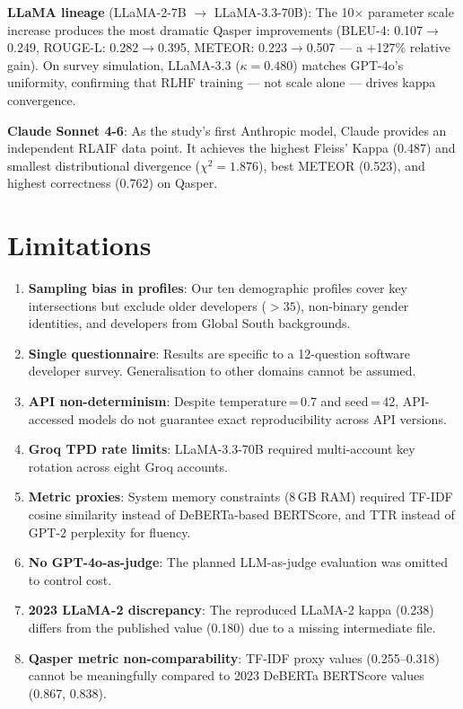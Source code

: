 \documentclass[11pt,a4paper]{article}
\begin{document}
\textbf{LLaMA lineage} (LLaMA-2-7B $\rightarrow$ LLaMA-3.3-70B): The 10$\times$
parameter scale increase produces the most dramatic Qasper improvements
(BLEU-4: 0.107$\rightarrow$0.249, ROUGE-L: 0.282$\rightarrow$0.395, METEOR:
0.223$\rightarrow$0.507 --- a {+}127\% relative gain). On survey simulation,
LLaMA-3.3 ($\kappa{=}0.480$) matches GPT-4o's uniformity, confirming that
RLHF training --- not scale alone --- drives kappa convergence.

\textbf{Claude Sonnet 4-6}: As the study's first Anthropic model, Claude
provides an independent RLAIF data point. It achieves the highest Fleiss'
Kappa (0.487) and smallest distributional divergence ($\chi^2{=}1.876$), best
METEOR (0.523), and highest correctness (0.762) on Qasper.

\section{Limitations}
\label{sec:limitations}

\begin{enumerate}
  \item \textbf{Sampling bias in profiles}: Our ten demographic profiles cover
    key intersections but exclude older developers ($>35$), non-binary gender
    identities, and developers from Global South backgrounds.

  \item \textbf{Single questionnaire}: Results are specific to a 12-question
    software developer survey. Generalisation to other domains cannot be assumed.

  \item \textbf{API non-determinism}: Despite temperature\,=\,0.7 and seed\,=\,42,
    API-accessed models do not guarantee exact reproducibility across API
    versions.

  \item \textbf{Groq TPD rate limits}: LLaMA-3.3-70B required multi-account
    key rotation across eight Groq accounts.

  \item \textbf{Metric proxies}: System memory constraints (8\,GB RAM) required
    TF-IDF cosine similarity instead of DeBERTa-based BERTScore, and TTR
    instead of GPT-2 perplexity for fluency.

  \item \textbf{No GPT-4o-as-judge}: The planned LLM-as-judge evaluation was
    omitted to control cost.

  \item \textbf{2023 LLaMA-2 discrepancy}: The reproduced LLaMA-2 kappa
    (0.238) differs from the published value (0.180) due to a missing
    intermediate file.

  \item \textbf{Qasper metric non-comparability}: TF-IDF proxy values
    (0.255--0.318) cannot be meaningfully compared to 2023 DeBERTa BERTScore
    values (0.867, 0.838).
\end{enumerate}
\end{document}
